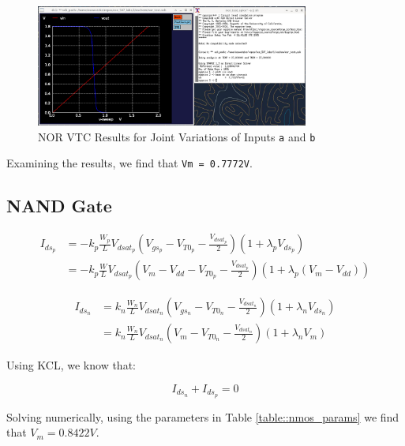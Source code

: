 \documentclass[fleqn]{article}
\begin{document}
	\begin{figure}[H]
		\centerline{\includegraphics[width=0.8\textwidth]{nor_vtc_sweep_va_vb.png}}
		\caption{NOR VTC Results for Joint Variations of Inputs \texttt{a} and \texttt{b}}
		\label{fig::nor_vtc_sweep_va_vb}
	\end{figure}
	
	Examining the results, we find that \texttt{Vm = 0.7772V}.
	
	\subsection{NAND Gate}

	\begin{align}
		I_{ds_p} &= -k_p\frac{W_p}{L}V_{dsat_p}\left(V_{gs_p} - V_{T0_p} - \frac{V_{dsat_p}}{2}\right)\left(1 + {\lambda_p}V_{ds_p}\right) \\
		&= -k_p\frac{W}{L}V_{dsat_p}\left(V_m - V_{dd} - V_{T0_p} - \frac{V_{dsat_p}}{2}\right)\left(1 + {\lambda_p}(V_m - V_{dd})\right)
	\end{align}
	
	\begin{align}
		I_{ds_n} &= k_n\frac{W_n}{L}V_{dsat_n}\left(V_{gs_n} - V_{T0_n} - \frac{V_{dsat_n}}{2}\right)\left(1 + {\lambda_n}V_{ds_n}\right) \\
		&= k_n\frac{W_n}{L}V_{dsat_n}\left(V_m - V_{T0_n} - \frac{V_{dsat_n}}{2}\right)\left(1 + {\lambda_n}V_m\right)
	\end{align}
	
	Using KCL, we know that:
	
	\begin{equation}
		I_{ds_n} + I_{ds_p} = 0
	\end{equation}
	
	Solving numerically, using the parameters in Table \ref{table::nmos_params} we find that $V_m = 0.8422 V$.
	
	
\end{document}
